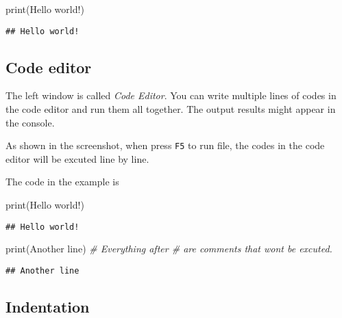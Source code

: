 \documentclass[
]{book}
\newenvironment{Shaded}{\begin{snugshade}}{\end{snugshade}}
\newcommand{\BuiltInTok}[1]{#1}
\newcommand{\CommentTok}[1]{\textcolor[rgb]{0.56,0.35,0.01}{\textit{#1}}}
\newcommand{\NormalTok}[1]{#1}
\newcommand{\StringTok}[1]{\textcolor[rgb]{0.31,0.60,0.02}{#1}}
\begin{document}
\begin{Shaded}
\begin{Highlighting}[]
\BuiltInTok{print}\NormalTok{(}\StringTok{\textquotesingle{}Hello world!\textquotesingle{}}\NormalTok{)}
\end{Highlighting}
\end{Shaded}

\begin{verbatim}
## Hello world!
\end{verbatim}

\hypertarget{code-editor}{%
\subsection{Code editor}\label{code-editor}}

The left window is called \emph{Code Editor}. You can write multiple lines of codes in the code editor and run them all together. The output results might appear in the console.

As shown in the screenshot, when press \texttt{F5} to run file, the codes in the code editor will be excuted line by line.

The code in the example is

\begin{Shaded}
\begin{Highlighting}[]
\BuiltInTok{print}\NormalTok{(}\StringTok{\textquotesingle{}Hello world!\textquotesingle{}}\NormalTok{)}
\end{Highlighting}
\end{Shaded}

\begin{verbatim}
## Hello world!
\end{verbatim}

\begin{Shaded}
\begin{Highlighting}[]
\BuiltInTok{print}\NormalTok{(}\StringTok{\textquotesingle{}Another line\textquotesingle{}}\NormalTok{)}
\CommentTok{\# Everything after \# are comments that won\textquotesingle{}t be excuted.}
\end{Highlighting}
\end{Shaded}

\begin{verbatim}
## Another line
\end{verbatim}

\hypertarget{indentation}{%
\subsection{Indentation}\label{indentation}}
\end{document}
